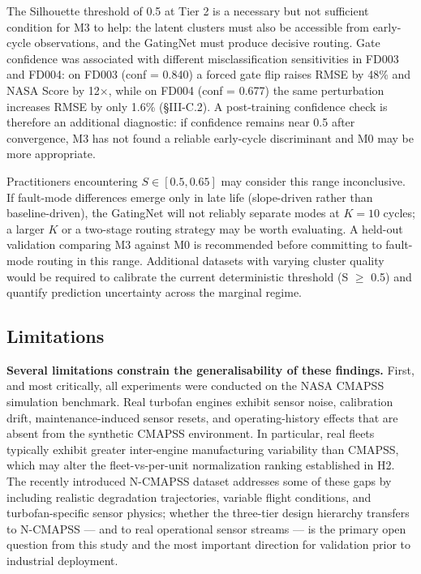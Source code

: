 \documentclass[review,12pt]{elsarticle}
\begin{document}
The Silhouette threshold of 0.5 at Tier 2 is a necessary but not sufficient condition for M3 to help: the latent clusters must also be accessible from early-cycle observations, and the GatingNet must produce decisive routing. Gate confidence was associated with different misclassification sensitivities in FD003 and FD004: on FD003 (conf = 0.840) a forced gate flip raises RMSE by 48\% and NASA Score by 12$\times$, while on FD004 (conf = 0.677) the same perturbation increases RMSE by only 1.6\% (\S{}III-C.2). A post-training confidence check is therefore an additional diagnostic: if confidence remains near 0.5 after convergence, M3 has not found a reliable early-cycle discriminant and M0 may be more appropriate.

Practitioners encountering $S \in [0.5, 0.65]$ may consider this range inconclusive. If fault-mode differences emerge only in late life (slope-driven rather than baseline-driven), the GatingNet will not reliably separate modes at $K = 10$ cycles; a larger $K$ or a two-stage routing strategy may be worth evaluating. A held-out validation comparing M3 against M0 is recommended before committing to fault-mode routing in this range. Additional datasets with varying cluster quality would be required to calibrate the current deterministic threshold (S $\geq$ 0.5) and quantify prediction uncertainty across the marginal regime.

\subsection{Limitations}

\textbf{Several limitations constrain the generalisability of these findings.} First, and most critically, all experiments were conducted on the NASA CMAPSS simulation benchmark. Real turbofan engines exhibit sensor noise, calibration drift, maintenance-induced sensor resets, and operating-history effects that are absent from the synthetic CMAPSS environment. In particular, real fleets typically exhibit greater inter-engine manufacturing variability than CMAPSS, which may alter the fleet-vs-per-unit normalization ranking established in H2. The recently introduced N-CMAPSS dataset \cite{ref16} addresses some of these gaps by including realistic degradation trajectories, variable flight conditions, and turbofan-specific sensor physics; whether the three-tier design hierarchy transfers to N-CMAPSS — and to real operational sensor streams — is the primary open question from this study and the most important direction for validation prior to industrial deployment.
\end{document}
